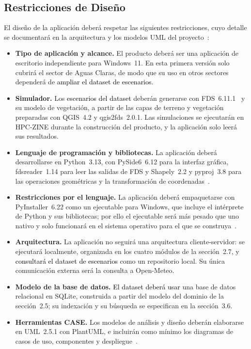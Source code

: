 \subsection{Restricciones de Diseño}
El diseño de la aplicación deberá respetar las siguientes restricciones, cuyo detalle se documentará en la arquitectura y los modelos UML del proyecto~\cite{pmp2026}:

\begin{itemize}
  \item \textbf{Tipo de aplicación y alcance.} El producto deberá ser una aplicación de escritorio independiente para Windows~11. En esta primera versión solo cubrirá el sector de Aguas Claras, de modo que su uso en otros sectores dependerá de \textcolor{black}{ampliar el dataset de escenarios}.
  \item \textbf{Simulador.} Los \textcolor{black}{escenarios del dataset} deberán generarse con FDS~6.11.1~\cite{fdsguide} y su modelo de vegetación, a partir de las capas de terreno y vegetación preparadas con QGIS~4.2 y qgis2fds~2.0.1. Las simulaciones se ejecutarán en HPC-ZINE durante la construcción del producto, y la aplicación solo leerá sus resultados.
  \item \textbf{Lenguaje de programación y bibliotecas.} La aplicación deberá desarrollarse en Python~3.13, con PySide6~6.12 para la interfaz gráfica, fdsreader~1.14 para leer las salidas de FDS y Shapely~2.2 y pyproj~3.8 para las operaciones geométricas y la transformación de coordenadas~\cite{pmp2026}.
  \item \textbf{Restricciones por el lenguaje.} La aplicación deberá empaquetarse con PyInstaller~6.22 como un ejecutable para Windows, que incluye el intérprete de Python y sus bibliotecas; por ello el ejecutable será más pesado que uno nativo y solo funcionará en el sistema operativo para el que se construya~\cite{pmp2026}.
  \item \textbf{Arquitectura.} La aplicación no seguirá una arquitectura cliente-servidor: se ejecutará localmente, organizada en los cuatro módulos de la sección~2.7, y \textcolor{black}{consultará el dataset de escenarios} como un repositorio local. Su única comunicación externa será la consulta a Open-Meteo.
  \item \textbf{Modelo de la base de datos.} \textcolor{black}{El dataset deberá usar} una base de datos relacional en SQLite, construida a partir del modelo del dominio de la sección~2.5; su indexación y su búsqueda se especifican en la sección~3.6.
  \item \textbf{Herramientas CASE.} Los modelos de análisis y diseño deberán elaborarse en UML~2.5.1 con PlantUML, e incluirán como mínimo los diagramas de casos de uso, componentes y despliegue~\cite{pmp2026}.
\end{itemize}